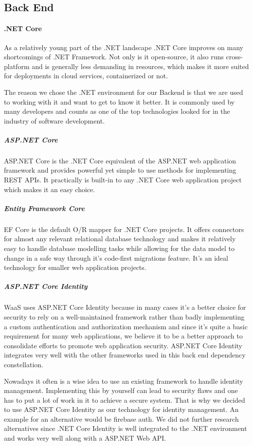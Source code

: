 \documentclass[titlepage, 12pt]{article}
\begin{document}
\subsection{Back End}

\paragraph{.NET Core}
As a relatively young part of the .NET landscape .NET Core improves on many shortcomings of .NET Framework. Not only is it open-source, it also runs cross-platform and is generally less demanding in resources,
which makes it more suited for deployments in cloud services, containerized or not.

The reason we chose the .NET environment for our Backend is that we are used to working with it and want to get to know it better. It is commonly used by many developers and counts as one of the top technologies looked for in the industry of software development.

\subparagraph{ASP.NET Core}
ASP.NET Core is the .NET Core equivalent of the ASP.NET web application framework and provides powerful yet simple to use methods for implementing REST APIs. It practically is built-in to any
.NET Core web application project which makes it an easy choice.

\subparagraph{Entity Framework Core}
EF Core is the default O/R mapper for .NET Core projects. It offers connectors for almost any relevant relational database technology and makes it relatively easy to handle database modelling tasks
while allowing for the data model to change in a safe way through it's code-first migrations feature. It's an ideal technology for smaller web application projects.

\subparagraph{ASP.NET Core Identity}
WaaS uses ASP.NET Core Identity because in many cases it's a better choice for security to rely on a well-maintained framework rather than badly implementing a custom authentication and authorization mechanism and
since it's quite a basic requirement for many web applications, we believe it to be a better approach to consolidate efforts to promote web application security. ASP.NET Core Identity integrates very well with the other
frameworks used in this back end dependency constellation.

Nowadays it often is a wise idea to use an existing framework to handle identity management. Implementing this by yourself can lead to security flaws and one has to put a lot of work in it to achieve a secure system. That is why we decided to use ASP.NET Core Identity as our technology for identity management. An example for an alternative would be firebase auth. We did not further research alternatives since .NET Core Identity is well integrated to the .NET environment and works very well along with a ASP.NET Web API.
\end{document}
